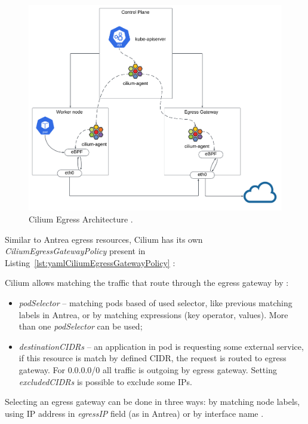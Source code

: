 \begin{figure}[tbh]
    \centering
    \includegraphics[width=0.9\columnwidth]{images/cilium_egress_hq.png}
    \caption{Cilium Egress Architecture \cite{CiliumUseCases}.}
    \label{fig:ciliumEgressArch}
\end{figure}

Similar to Antrea egress resources, Cilium has its own \textit{CiliumEgressGatewayPolicy} present in Listing~\ref{lst:yamlCiliumEgressGatewayPolicy} \cite{CiliumDocs}:

Cilium allows matching the traffic that route through the egress gateway by \cite{CiliumDocs}:
\begin{itemize}
    \item \textit{podSelector} -- matching pods based of used selector, like previous matching labels in Antrea, or by matching expressions (key operator, values). More than one \textit{podSelector} can be used;
    \item \textit{destinationCIDRs} -- an application in pod is requesting some external service, if this resource is match by defined CIDR, the request is routed to egress gateway. For 0.0.0.0/0 all traffic is outgoing by egress gateway. Setting \textit{excludedCIDRs} is possible to exclude some IPs.
\end{itemize}

Selecting an egress gateway can be done in three ways: by matching node labels, using IP address in \textit{egressIP} field (as in Antrea) or by interface name \cite{CiliumDocs}. 

